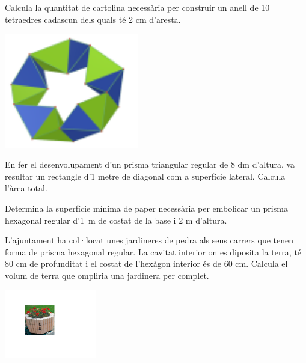 \begin{activitats}
\begin{mylist}

\exer  Calcula la quantitat de cartolina necessària per construir un anell de 10 tetraedres cadascun dels quals té 2 cm d'aresta. 
\begin{center}
	\includegraphics[width=0.44\textwidth]{img-11/image655}
\end{center}


\exer En fer el desenvolupament d'un prisma triangular regular de 8 dm d'altura, va resultar un rectangle d'1 metre de diagonal com a superfície lateral. Calcula l'àrea total.


\exer  Determina la superfície mínima de paper necessària per embolicar un prisma hexagonal regular d'1~m de costat de la base i 2 m d'altura.



\exer  L'ajuntament ha col·locat unes jardineres de pedra als seus carrers que tenen forma de prisma hexagonal regular. La cavitat interior on es diposita la terra, té 80 cm de profunditat i el costat de l'hexàgon interior és de 60 cm. Calcula el volum de terra que ompliria una jardinera per complet.

\begin{center}
\includegraphics[width=0.3\textwidth]{img-11/jardinera}
\end{center}


\end{mylist}
\end{activitats}
